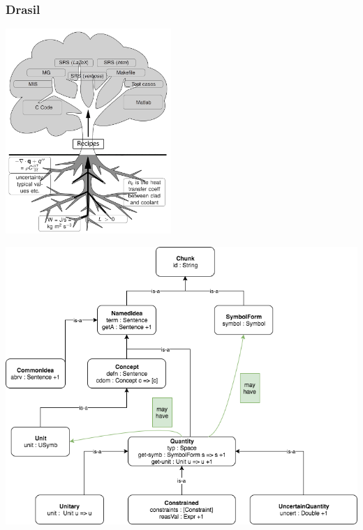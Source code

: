 \documentclass{beamer}
\begin{document}

\begin{frame}

\frametitle{Drasil}
\begin{center}
\includegraphics[height=21em]{tree.png}
\end{center}
\end{frame}


\begin{frame}
\includegraphics[width=1\textwidth]{class_hierarchy.png}
\end{frame}


\end{document}
